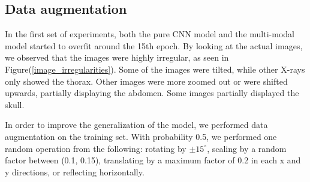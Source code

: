 \documentclass[10pt,letterpaper]{article}
\begin{document}
\subsection{Data augmentation}
In the first set of experiments, both the pure CNN model and the multi-modal model started to overfit around the 15th epoch. By looking at the actual images, we observed that the images were highly irregular, as seen in Figure(\ref{image_irregularities}). Some of the images were tilted, while other X-rays only showed the thorax. Other images were more zoomed out or were shifted upwards, partially displaying the abdomen. Some images partially displayed the skull.

In order to improve the generalization of the model, we performed data augmentation on the training set. With probability 0.5, we performed one random operation from the following: rotating by $\pm 15^\circ$, scaling by a random factor between (0.1, 0.15), translating by a maximum factor of 0.2 in each x and y directions, or reflecting horizontally.
\end{document}
